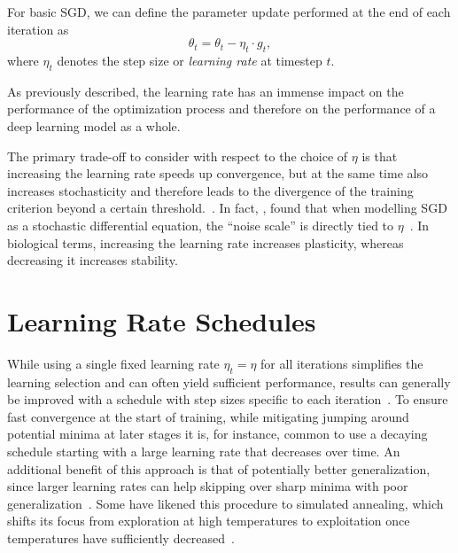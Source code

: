 \documentclass[letterpaper]{article} %
\begin{document}
For basic SGD, we can define the parameter update performed at the end of each iteration as
\begin{equation}
	\theta_{t}  = \theta_{t} - \eta_t \cdot g_t,
\end{equation}
where $\eta_t$ denotes the step size or \textit{learning rate} at timestep $t$.

As previously described, the learning rate has an immense impact on the performance of the optimization process and therefore on the performance of a deep learning model as a whole.

The primary trade-off to consider with respect to the choice of $\eta$ is that increasing the learning rate speeds up convergence, but at the same time also increases stochasticity and therefore leads to the divergence of the training criterion beyond a certain threshold.~\cite{bengioPracticalRecommendationsGradientbased2012}.
In fact, \citet{smithBayesianPerspectiveGeneralization2018}, found that when modelling SGD as a stochastic differential equation, the “noise scale” is directly tied to $\eta$~\cite{smithBayesianPerspectiveGeneralization2018}.
In biological terms, increasing the learning rate increases plasticity, whereas decreasing it increases stability.

\section{Learning Rate Schedules}

While using a single fixed learning rate $\eta_t = \eta$ for all iterations simplifies the learning selection and can often yield sufficient performance, results can generally be improved with a schedule with step sizes specific to each iteration~\cite{wuDemystifyingLearningRate2019b}. 
To ensure fast convergence at the start of training, while mitigating jumping around potential minima at later stages it is, for instance, common to use a decaying schedule starting with a large learning rate that decreases over time.
An additional benefit of this approach is that of potentially better generalization, since larger learning rates can help skipping over sharp minima with poor generalization~\cite{hochreiterFlatMinima1997,chaudhariEntropySGDBiasingGradient2017}.
Some have likened this procedure to simulated annealing, which shifts its focus from exploration at high temperatures to exploitation once temperatures have sufficiently decreased~\cite{smithDonDecayLearning2018}.
\end{document}
